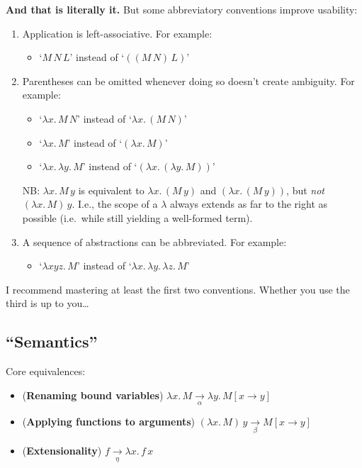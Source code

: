 \documentclass{article}
\newcommand{\ra}{\rightarrow}
\begin{document}
\textbf{And that is literally it.} But some abbreviatory conventions improve
usability: 
\begin{enumerate}
  \item
    Application is left-associative. For example:
    \begin{itemize}
      \item
        `$M\, N\, L$' instead of `$((M\, N)\, L)$'
    \end{itemize}
    
  \item
    Parentheses can be omitted whenever doing so doesn't create ambiguity. For
    example:
    \begin{itemize}
      \item
         `$\lambda x.\,M\,N$' instead of `$\lambda x.\,(M\,N)$'
         
      \item
        `$\lambda x.\,M$' instead of `$(\lambda x.\,M)$'

      \item
        `$\lambda x.\,\lambda y.\,M$' instead of `$(\lambda x.\,(\lambda
        y.\,M))$'
    \end{itemize}
    NB\@: $\lambda x.\, M\, y$ is equivalent to $\lambda x.\, (M\, y)$ and
    $(\lambda x.\,(M\, y))$, but \emph{not} $(\lambda x.\,M)\, y$. I.e., the
    scope of a $\lambda$ always extends as far to the right as possible
    (i.e.~while still yielding a well-formed term).

  \item
    A sequence of abstractions can be abbreviated. For example:
    \begin{itemize}
      \item 
        `$\lambda xyz.\,M$' instead of `$\lambda x.\,\lambda y.\,\lambda
        z.\,M$'
    \end{itemize}
\end{enumerate}

I recommend mastering at least the first two conventions. Whether you use the
third is up to you\dots

\subsection{``Semantics''} 

Core equivalences:
\begin{itemize}
  \item
    (\textbf{Renaming bound variables}) 
    $\lambda x.\,M \underset{\alpha}{\longrightarrow} \lambda y.\, M[x \ra y]$

  \item
    (\textbf{Applying functions to arguments})
    $(\lambda x.\,M)\,y \underset{\beta}{\longrightarrow} M[x \ra y]$

  \item
    (\textbf{Extensionality}) $f \underset{\eta}{\longrightarrow} \lambda
    x.\, f\, x$
\end{itemize}
\end{document}
